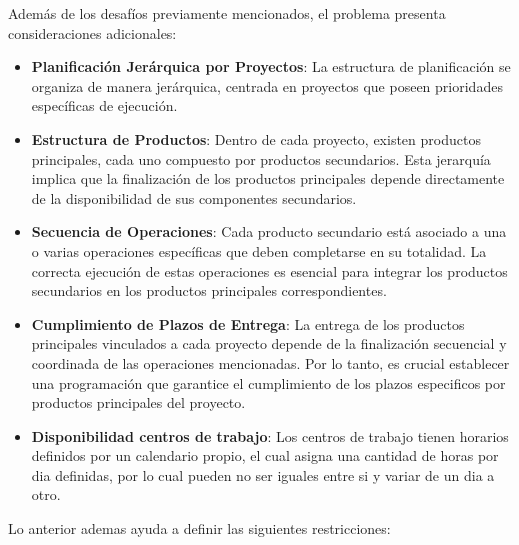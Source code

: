 \documentclass[preprint,12pt,authoryear]{elsarticle}
\begin{document}
Además de los desafíos previamente mencionados, el problema presenta consideraciones adicionales:

\begin{itemize}
    \item \textbf{Planificación Jerárquica por Proyectos}: La estructura de planificación se organiza de manera jerárquica, centrada en proyectos que poseen prioridades específicas de ejecución. 
    
    \item \textbf{Estructura de Productos}: Dentro de cada proyecto, existen productos principales, cada uno compuesto por productos secundarios. Esta jerarquía implica que la finalización de los productos principales depende directamente de la disponibilidad de sus componentes secundarios.
    
    \item \textbf{Secuencia de Operaciones}: Cada producto secundario está asociado a una o varias operaciones específicas que deben completarse en su totalidad. La correcta ejecución de estas operaciones es esencial para integrar los productos secundarios en los productos principales correspondientes.
    
    \item \textbf{Cumplimiento de Plazos de Entrega}: La entrega de los productos principales  vinculados a cada proyecto depende de la finalización secuencial y coordinada de las operaciones mencionadas. Por lo tanto, es crucial establecer una programación que garantice el cumplimiento de los plazos especificos por productos principales del proyecto.

    \item \textbf{Disponibilidad centros de trabajo}: Los centros de trabajo tienen horarios definidos por un calendario propio, el cual asigna una cantidad de horas por dia definidas, por lo cual pueden no ser iguales entre si y variar de un dia a otro.
\end{itemize}

Lo anterior ademas ayuda a definir las siguientes restricciones:
\end{document}
